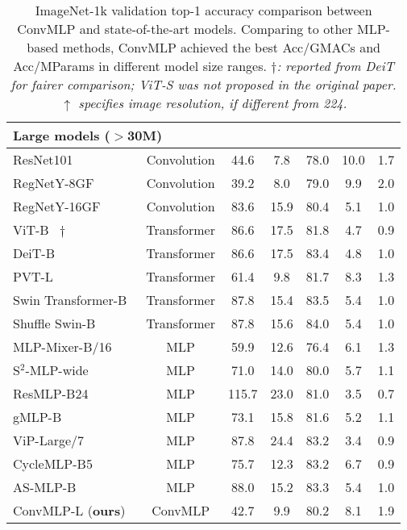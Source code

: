 \documentclass[final]{cvpr}
\begin{document}
\begin{table*}[!ht]
{\begin{tabular}{l|cccc|cc}
\multicolumn{3}{l}{\textbf{{Large models ($>$30M)}}} \\
\midrule
ResNet101~\cite{he2016deep} & Convolution & 44.6 & 7.8 & 78.0 & 10.0 & 1.7 \\
RegNetY-8GF~\cite{radosavovic2020designing} & Convolution & 39.2 & 8.0 & 79.0 & 9.9 & 2.0 \\
RegNetY-16GF~\cite{radosavovic2020designing} & Convolution & 83.6 & 15.9 & 80.4 & 5.1 & 1.0 \\
\midrule
ViT-B~\cite{dosovitskiy2020image} $\dagger$ & Transformer & 86.6 & 17.5 & 81.8 & 4.7 & 0.9 \\
DeiT-B~\cite{touvron2021training} & Transformer & 86.6 & 17.5 & 83.4 & 4.8 & 1.0 \\
PVT-L~\cite{wang2021pyramid} & Transformer & 61.4 & 9.8 & 81.7 & 8.3 & 1.3 \\
Swin Transformer-B~\cite{liu2021swin} & Transformer & 87.8 & 15.4 & 83.5 & 5.4 & 1.0 \\
Shuffle Swin-B~\cite{huang2021shuffle} & Transformer & 87.8 & 15.6 & 84.0 & 5.4 & 1.0 \\
\midrule
MLP-Mixer-B/16~\cite{tolstikhin2021mlp} & MLP & 59.9 & 12.6 & 76.4 & 6.1 & 1.3 \\
S$^2$-MLP-wide~\cite{yu2021s} & MLP & 71.0 & 14.0 & 80.0 & 5.7 & 1.1 \\
ResMLP-B24~\cite{touvron2021resmlp} & MLP & 115.7 & 23.0 & 81.0 & 3.5 & 0.7 \\
gMLP-B~\cite{liu2021pay} & MLP & 73.1 & 15.8 & 81.6 & 5.2 & 1.1 \\
ViP-Large/7~\cite{hou2021vision} & MLP & 87.8 & 24.4 & 83.2 & 3.4 & 0.9 \\
CycleMLP-B5~\cite{chen2021cyclemlp} & MLP & 75.7 & 12.3 & 83.2 & 6.7 & 0.9 \\
AS-MLP-B~\cite{lian2021mlp} & MLP & 88.0 & 15.2 & 83.3 & 5.4 & 1.0 \\
\midrule
ConvMLP-L (\textbf{ours}) & ConvMLP & 42.7 & 9.9 & 80.2 & 8.1 & 1.9 \\
\bottomrule[2pt]
\end{tabular}}
\caption{ImageNet-1k validation top-1 accuracy comparison between ConvMLP and state-of-the-art models. 
Comparing to other MLP-based methods, ConvMLP achieved the best Acc/GMACs and Acc/MParams in different model size ranges.
\textit{\small $\dagger$: reported from DeiT for fairer comparison; ViT-S was not proposed in the original paper. $\uparrow$ specifies image resolution, if different from 224.}}
\label{tab:imagenetclassif}
\end{table*} \begin{table*}[!ht]

\end{table*}
\end{document}
